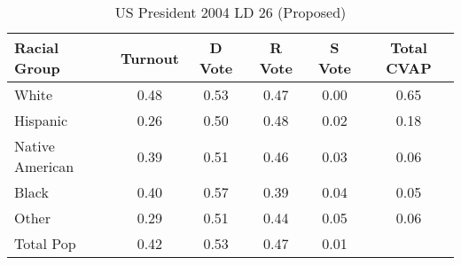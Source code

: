 \begin{table}[htb]
\begin{center}
\caption{US President 2004 LD 26 (Proposed)}
\label{pres04_cvap_ld_26}
\begin{tabular}{lccccc}
  \hline
Racial Group & Turnout & D Vote & R Vote & S Vote & Total CVAP \\ 
  \hline
White & 0.48 & 0.53 & 0.47 & 0.00 & 0.65 \\ 
  Hispanic & 0.26 & 0.50 & 0.48 & 0.02 & 0.18 \\ 
  Native American & 0.39 & 0.51 & 0.46 & 0.03 & 0.06 \\ 
  Black & 0.40 & 0.57 & 0.39 & 0.04 & 0.05 \\ 
  Other & 0.29 & 0.51 & 0.44 & 0.05 & 0.06 \\ 
  Total Pop & 0.42 & 0.53 & 0.47 & 0.01 &  \\ 
   \hline
\end{tabular}
\end{center}
\end{table}
